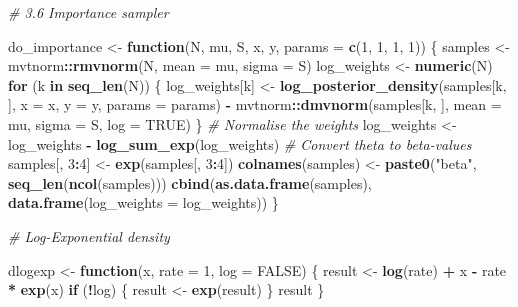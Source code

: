 \documentclass[
]{article}
\newenvironment{Shaded}{\begin{snugshade}}{\end{snugshade}}
\newcommand{\AttributeTok}[1]{\textcolor[rgb]{0.13,0.29,0.53}{#1}}
\newcommand{\CommentTok}[1]{\textcolor[rgb]{0.56,0.35,0.01}{\textit{#1}}}
\newcommand{\ConstantTok}[1]{\textcolor[rgb]{0.56,0.35,0.01}{#1}}
\newcommand{\ControlFlowTok}[1]{\textcolor[rgb]{0.13,0.29,0.53}{\textbf{#1}}}
\newcommand{\DecValTok}[1]{\textcolor[rgb]{0.00,0.00,0.81}{#1}}
\newcommand{\FunctionTok}[1]{\textcolor[rgb]{0.13,0.29,0.53}{\textbf{#1}}}
\newcommand{\NormalTok}[1]{#1}
\newcommand{\OtherTok}[1]{\textcolor[rgb]{0.56,0.35,0.01}{#1}}
\newcommand{\SpecialCharTok}[1]{\textcolor[rgb]{0.81,0.36,0.00}{\textbf{#1}}}
\newcommand{\StringTok}[1]{\textcolor[rgb]{0.31,0.60,0.02}{#1}}
\begin{document}
\begin{Shaded}
\begin{Highlighting}[]
\CommentTok{\# 3.6 Importance sampler}

\NormalTok{do\_importance }\OtherTok{\textless{}{-}} \ControlFlowTok{function}\NormalTok{(N, mu, S, x, y, }\AttributeTok{params =} \FunctionTok{c}\NormalTok{(}\DecValTok{1}\NormalTok{, }\DecValTok{1}\NormalTok{, }\DecValTok{1}\NormalTok{, }\DecValTok{1}\NormalTok{)) \{ }
\NormalTok{  samples }\OtherTok{\textless{}{-}}\NormalTok{ mvtnorm}\SpecialCharTok{::}\FunctionTok{rmvnorm}\NormalTok{(N, }\AttributeTok{mean =}\NormalTok{ mu, }\AttributeTok{sigma =}\NormalTok{ S)}
\NormalTok{log\_weights }\OtherTok{\textless{}{-}} \FunctionTok{numeric}\NormalTok{(N)}
\ControlFlowTok{for}\NormalTok{ (k }\ControlFlowTok{in} \FunctionTok{seq\_len}\NormalTok{(N)) \{}
\NormalTok{    log\_weights[k] }\OtherTok{\textless{}{-}}
      \FunctionTok{log\_posterior\_density}\NormalTok{(samples[k, ], }\AttributeTok{x =}\NormalTok{ x, }\AttributeTok{y =}\NormalTok{ y, }\AttributeTok{params =}\NormalTok{ params) }\SpecialCharTok{{-}}
\NormalTok{      mvtnorm}\SpecialCharTok{::}\FunctionTok{dmvnorm}\NormalTok{(samples[k, ], }\AttributeTok{mean =}\NormalTok{ mu, }\AttributeTok{sigma =}\NormalTok{ S, }\AttributeTok{log =} \ConstantTok{TRUE}\NormalTok{)}
\NormalTok{\}}
  \CommentTok{\# Normalise the weights}
\NormalTok{  log\_weights }\OtherTok{\textless{}{-}}\NormalTok{ log\_weights }\SpecialCharTok{{-}} \FunctionTok{log\_sum\_exp}\NormalTok{(log\_weights)}
  \CommentTok{\# Convert theta to beta{-}values}
\NormalTok{  samples[, }\DecValTok{3}\SpecialCharTok{:}\DecValTok{4}\NormalTok{] }\OtherTok{\textless{}{-}} \FunctionTok{exp}\NormalTok{(samples[, }\DecValTok{3}\SpecialCharTok{:}\DecValTok{4}\NormalTok{])}
  \FunctionTok{colnames}\NormalTok{(samples) }\OtherTok{\textless{}{-}} \FunctionTok{paste0}\NormalTok{(}\StringTok{"beta"}\NormalTok{, }\FunctionTok{seq\_len}\NormalTok{(}\FunctionTok{ncol}\NormalTok{(samples)))}
  \FunctionTok{cbind}\NormalTok{(}\FunctionTok{as.data.frame}\NormalTok{(samples),}
        \FunctionTok{data.frame}\NormalTok{(}\AttributeTok{log\_weights =}\NormalTok{ log\_weights))}
\NormalTok{\}}

\CommentTok{\# Log{-}Exponential density}

\NormalTok{dlogexp }\OtherTok{\textless{}{-}} \ControlFlowTok{function}\NormalTok{(x, }\AttributeTok{rate =} \DecValTok{1}\NormalTok{, }\AttributeTok{log =} \ConstantTok{FALSE}\NormalTok{) \{ }
\NormalTok{  result }\OtherTok{\textless{}{-}} \FunctionTok{log}\NormalTok{(rate) }\SpecialCharTok{+}\NormalTok{ x }\SpecialCharTok{{-}}\NormalTok{ rate }\SpecialCharTok{*} \FunctionTok{exp}\NormalTok{(x)}
\ControlFlowTok{if}\NormalTok{ (}\SpecialCharTok{!}\NormalTok{log) \{}
\NormalTok{result }\OtherTok{\textless{}{-}} \FunctionTok{exp}\NormalTok{(result) \}}
\NormalTok{result \}}


\end{Highlighting}
\end{Shaded}
\end{document}
